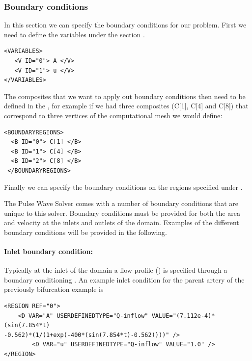 \subsubsection{Boundary conditions}
In this section we can specify the boundary conditions for our problem.
First we need to define the variables under the section .
\begin{lstlisting}[style=XmlStyle]        
<VARIABLES>
   <V ID="0"> A </V>
   <V ID="1"> u </V>
</VARIABLES>
\end{lstlisting}

The composites that we want to apply out boundary conditions then need to be defined in the , for example if we had three composites (C[1], C[4] and C[8]) that correspond to three vertices of the computational mesh we would define:
\begin{lstlisting}[style=XmlStyle]        
<BOUNDARYREGIONS>
  <B ID="0"> C[1] </B>
  <B ID="1"> C[4] </B>
  <B ID="2"> C[8] </B>
 </BOUNDARYREGIONS>
\end{lstlisting}

Finally we can specify the boundary conditions on the regions specified under .

The Pulse Wave Solver comes with a number of boundary conditions that are unique to this solver. Boundary conditions must be provided for both the area and velocity at the inlets and outlets of the domain. Examples of the different boundary conditions will be provided in the following.

\paragraph{Inlet boundary condition:~} Typically at the inlet of the domain a flow profile () is specified through a  boundary conditioning . An example inlet condition for the parent artery of the previously bifurcation example is
\begin{lstlisting}[style=XmlStyle]
<REGION REF="0">
	<D VAR="A" USERDEFINEDTYPE="Q-inflow" VALUE="(7.112e-4)*(sin(7.854*t) 
-0.562)*(1/(1+exp(-400*(sin(7.854*t)-0.562))))" />
        <D VAR="u" USERDEFINEDTYPE="Q-inflow" VALUE="1.0" />
</REGION>
\end{lstlisting}

